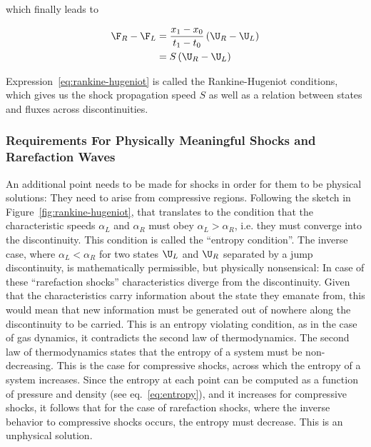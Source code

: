which finally leads to

\begin{align}
    \F_R - \F_L &= \frac{x_1 - x_0}{t_1 - t_0} \left( \U_R - \U_L \right) \\
                &= S \left( \U_R - \U_L \right) \label{eq:rankine-hugeniot}
\end{align}

Expression~\ref{eq:rankine-hugeniot} is called the Rankine-Hugeniot conditions, which gives us the
shock propagation speed $S$ as well as a relation between states and fluxes across discontinuities.






\subsubsection{Requirements For Physically Meaningful Shocks and Rarefaction Waves}

An additional point needs to be made for shocks in order for them to be physical solutions: They
need to arise from compressive regions. Following the sketch in Figure~\ref{fig:rankine-hugeniot},
that translates to the condition that the characteristic speeds $\alpha_L$ and $\alpha_R$ must obey
$\alpha_L > \alpha_R$, i.e. they must converge into the discontinuity. This condition is called
the ``entropy condition''. The inverse case, where $\alpha_L < \alpha_R$ for two states $\U_L$ and
$\U_R$ separated by a jump discontinuity, is mathematically permissible, but physically
nonsensical: In case of these ``rarefaction shocks'' characteristics diverge from the discontinuity.
Given that the characteristics carry information about the state they emanate from, this would mean
that new information must be generated out of nowhere along the discontinuity to be carried. This is
an entropy violating condition, as in the case of gas dynamics, it contradicts the second law of
thermodynamics. The second law of thermodynamics states that the entropy of a system must be
non-decreasing. This is the case for compressive shocks, across which the entropy of a system
increases. Since the entropy at each point can be computed as a function of pressure and density
(see eq.~\ref{eq:entropy}), and it increases for compressive shocks, it follows that for the case
of rarefaction shocks, where the inverse behavior to compressive shocks occurs, the entropy must
decrease. This is an unphysical solution.

